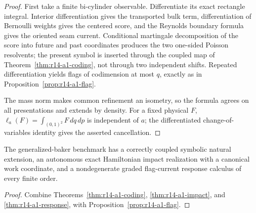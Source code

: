 \begin{proof}
First take a finite bi-cylinder observable.  Differentiate its exact rectangle
integral.  Interior differentiation gives the transported bulk term,
differentiation of Bernoulli weights gives the centered score, and the
Reynolds boundary formula gives the oriented seam current.  Conditional
martingale decomposition of the score into future and past coordinates
produces the two one-sided Poisson resolvents; the present symbol is inserted
through the coupled map of Theorem~\ref{thm:r14-a1-coding}, not through two
independent shifts.  Repeated differentiation yields flags of codimension at
most \(q\), exactly as in Proposition~\ref{prop:r14-a1-flag}.

The mass norm makes common refinement an isometry, so the formula agrees on
all presentations and extends by density.  For a fixed physical \(F\),
\(\ell_a(F)=\int_{(0,1)^2}F\,dq\,dp\) is independent of \(a\); the differentiated
change-of-variables identity gives the asserted cancellation.
\end{proof}

\begin{theorem}
\label{thm:r14-a1-main}
The generalized-baker benchmark has a correctly coupled symbolic natural
extension, an autonomous exact Hamiltonian impact realization with a
canonical work coordinate, and a nondegenerate graded flag-current response
calculus of every finite order.
\end{theorem}

\begin{proof}
Combine Theorems~\ref{thm:r14-a1-coding},
\ref{thm:r14-a1-impact}, and \ref{thm:r14-a1-response}, with
Proposition~\ref{prop:r14-a1-flag}.
\end{proof}
